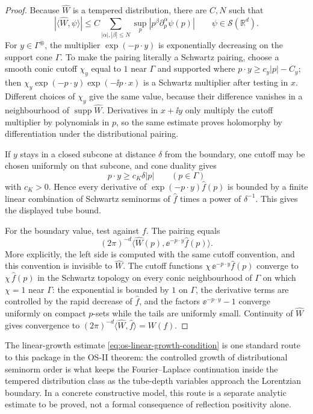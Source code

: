 \begin{proof}
Because \(\widehat W\) is a tempered distribution, there are \(C,N\) such
that
\[
  |\langle\widehat W,\psi\rangle|
  \le
  C\sum_{|\alpha|,|\beta|\le N}
  \sup_p |p^\beta\partial_p^\alpha\psi(p)|
  \qquad \psi\in\mathcal S(\mathbb R^d).
\]
For \(y\in\Gamma^\circledast\), the multiplier
\(\exp(-p\cdot y)\) is exponentially decreasing on the support cone
\(\Gamma\).  To make the pairing literally a Schwartz pairing, choose a
smooth conic cutoff \(\chi_y\) equal to \(1\) near \(\Gamma\) and supported
where \(p\cdot y\ge c_y|p|-C_y\); then
\(\chi_y\exp(-p\cdot y)\exp(-\ii p\cdot x)\) is a Schwartz multiplier after
testing in \(x\).  Different choices of \(\chi_y\) give the same value,
because their difference vanishes in a neighbourhood of
\(\operatorname{supp}\widehat W\).  Derivatives in \(x+\ii y\) only multiply
the cutoff multiplier by polynomials in \(p\), so the same estimate proves
holomorphy by differentiation under the distributional pairing.

If \(y\) stays in a closed subcone at distance \(\delta\) from the boundary,
one cutoff may be chosen uniformly on that subcone, and cone duality gives
\[
  p\cdot y\ge c_K\delta |p|
  \qquad (p\in\Gamma)
\]
with \(c_K>0\).  Hence every derivative of
\(\exp(-p\cdot y)\widehat f(p)\) is bounded by a finite linear combination
of Schwartz seminorms of \(\widehat f\) times a power of \(\delta^{-1}\).
This gives the displayed tube bound.

For the boundary value, test against \(f\).  The pairing equals
\[
  (2\pi)^{-d}
  \langle\widehat W(p), \ee^{-p\cdot y}\widehat f(p)\rangle .
\]
More explicitly, the left side is computed with the same cutoff convention,
and this convention is invisible to \(\widehat W\).  The cutoff functions
\(\chi\,\ee^{-p\cdot y}\widehat f(p)\) converge to \(\chi\,\widehat f(p)\)
in the Schwartz topology on every conic neighbourhood of \(\Gamma\) on which
\(\chi=1\) near \(\Gamma\): the exponential is bounded by \(1\) on
\(\Gamma\), the derivative terms are controlled by the rapid decrease of
\(\widehat f\), and the factors \(\ee^{-p\cdot y}-1\) converge uniformly on
compact \(p\)-sets while the tails are uniformly small.  Continuity of
\(\widehat W\) gives convergence to
\((2\pi)^{-d}\langle\widehat W,\widehat f\rangle=W(f)\).
\end{proof}

The linear-growth estimate \eqref{eq:os-linear-growth-condition} is one
standard route to this package in the OS-II theorem: the controlled growth of
distributional seminorm order is what keeps the Fourier--Laplace continuation
inside the tempered distribution class as the tube-depth variables approach
the Lorentzian boundary.  In a concrete constructive model, this route is a
separate analytic estimate to be proved, not a formal consequence of
reflection positivity alone.

